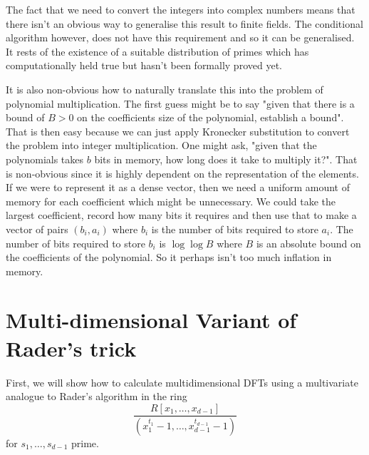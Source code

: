The fact that we need to convert the integers into complex numbers means that there isn't an obvious way to generalise this result to finite fields. The conditional algorithm however, does not have this requirement and so it can be generalised. It rests of the existence of a suitable distribution of primes which has computationally held true but hasn't been formally proved yet.

\medskip

It is also non-obvious how to naturally translate this into the problem of polynomial multiplication. The first guess might be to say "given that there is a bound of $B > 0$ on the coefficients size of the polynomial, establish a bound". That is then easy because we can just apply Kronecker substitution to convert the problem into integer multiplication. One might ask, "given that the polynomials takes $b$ bits in memory, how long does it take to multiply it?". That is non-obvious since it is highly dependent on the representation of the elements. If we were to represent it as a dense vector, then we need a uniform amount of memory for each coefficient which might be unnecessary. We could take the largest coefficient, record how many bits it requires and then use that to make a vector of pairs $(b_i, a_i)$ where $b_i$ is the number of bits required to store $a_i$. The number of bits required to store $b_i$ is $\log \log B$ where $B$ is an absolute bound on the coefficients of the polynomial. So it perhaps isn't too much inflation in memory.


\section{Multi-dimensional Variant of Rader's trick}%
\label{sec:multi_dimensional_variant_of_rader_s_trick}

First, we will show how to calculate multidimensional DFTs using a multivariate analogue to Rader's algorithm in the ring
\[
    \frac{R[x_1, \ldots, x_{d-1}]}{(x_1^{t_1} - 1, \ldots, x_{d-1}^{t_{d-1}} - 1)} 
\]
for $s_1, \ldots, s_{d-1}$ prime.




